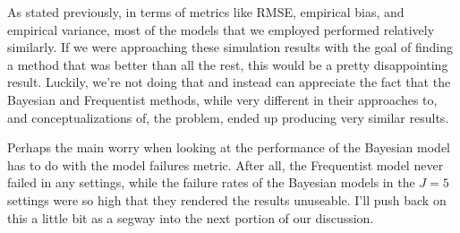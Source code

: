 \documentclass[12pt,twoside]{reedthesis}
\begin{document}
As stated previously, in terms of metrics like RMSE, empirical bias, and empirical variance, most of the models that we employed performed relatively similarly. If we were approaching these simulation results with the goal of finding a method that was better than all the rest, this would be a pretty disappointing result. Luckily, we're not doing that and instead can appreciate the fact that the Bayesian and Frequentist methods, while very different in their approaches to, and conceptualizations of, the problem, ended up producing very similar results.

Perhaps the main worry when looking at the performance of the Bayesian model has to do with the model failures metric. After all, the Frequentist model never failed in any settings, while the failure rates of the Bayesian models in the \(J=5\) settings were so high that they rendered the results unuseable. I'll push back on this a little bit as a segway into the next portion of our discussion.
\end{document}
